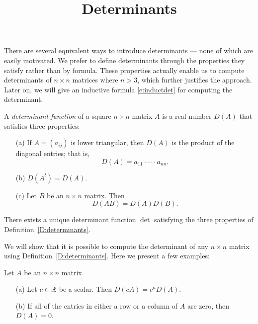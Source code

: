 \documentclass{ximera}
\title{Determinants}
\begin{document}
\begin{abstract}
\end{abstract}
\maketitle

 
\label{S:det}
 
There are several equivalent ways to introduce determinants --- none of which 
are easily motivated.  We prefer to define determinants through the properties 
they satisfy rather than by formula.  These properties actually enable us to 
compute determinants of $n\times n$ matrices where $n>3$, which further 
justifies the approach. Later on, we will give an inductive formula 
\eqref{e:inductdet} for computing the determinant. 
 
\begin{definition}  \label{D:determinants}
A {\em determinant function} of a square $n\times n$ matrix $A$ is a real
number $D(A)$ that satisfies three properties:
\begin{itemize} 
\item[(a)]  If $A=(a_{ij})$ is lower 
triangular, then
 $D(A)$ is the product of the diagonal entries;
that is,
\[
D(A) = a_{11}\cdot\cdots\cdot a_{nn}.
\]
\item[(b)]  $D(A^t)=D(A)$.
\item[(c)]  Let $B$ be an $n\times n$ matrix.  
Then
\begin{equation} \label{e:detproduct}
D(AB) = D(A) D(B).
\end{equation}
\end{itemize}
\end{definition} 

\begin{theorem}  \label{T:determinants}
There exists a unique determinant function $\det$ satisfying the three
properties of Definition~\ref{D:determinants}.
\end{theorem}

We will show that it is possible to compute the determinant of
any $n\times n$ matrix using Definition~\ref{D:determinants}.
Here we present a few examples:

\begin{lemma} \label{L:detbasic}
Let $A$ be an $n\times n$ matrix.
\begin{itemize}
\item[(a)]   Let $c\in\mbox{$\mathbb{R}$}$ be a scalar.  Then $D(cA) = c^n D(A)$.
\item[(b)] If all of the entries in either a row or a column of $A$ are 
zero, then $D(A)=0$.
\end{itemize}
\end{lemma}
\end{document}
